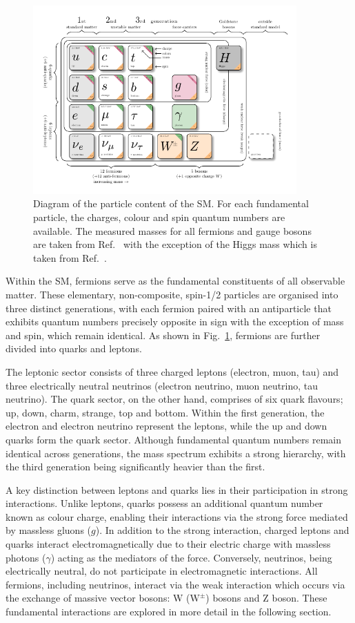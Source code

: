 \begin{figure}[h]
\centering
\includegraphics[width= 0.9\textwidth]{Figures/Introduction/Particles.pdf}
\caption{Diagram of the particle content of the SM. For each fundamental particle, the charges, colour and spin quantum numbers are available. The measured masses for all fermions and gauge bosons are taken from Ref.~\cite{ParticleMasses} with the exception of the Higgs mass which is taken from Ref.~\cite{Higgs_Mass}.}
\label{Figure:Introduction_1}
\end{figure}

Within the SM, fermions serve as the fundamental constituents of all observable matter. These elementary, non-composite, spin-1/2 particles are organised into three distinct generations, with each fermion paired with an antiparticle that exhibits quantum numbers precisely opposite in sign with the exception of mass and spin, which remain identical. As shown in Fig.~\ref{Figure:Introduction_1}, fermions are further divided into quarks and leptons. 

The leptonic sector consists of three charged leptons (electron, muon, tau) and three electrically neutral neutrinos (electron neutrino, muon neutrino, tau neutrino). The quark sector, on the other hand, comprises of six quark flavours; up, down, charm, strange, top and bottom. Within the first generation, the electron and electron neutrino represent the leptons, while the up and down quarks form the quark sector. Although fundamental quantum numbers remain identical across generations, the mass spectrum exhibits a strong hierarchy, with the third generation being significantly heavier than the first.

A key distinction between leptons and quarks lies in their participation in strong interactions. Unlike leptons, quarks possess an additional quantum number known as colour charge, enabling their interactions via the strong force mediated by massless gluons ($g$). In addition to the strong interaction, charged leptons and quarks interact electromagnetically due to their electric charge with massless photons ($\gamma$) acting as the mediators of the force. Conversely, neutrinos, being electrically neutral, do not participate in electromagnetic interactions. All fermions, including neutrinos, interact via the weak interaction which occurs via the exchange of massive vector bosons: W ($\text{W}^\pm$) bosons and Z boson. These fundamental interactions are explored in more detail in the following section.


